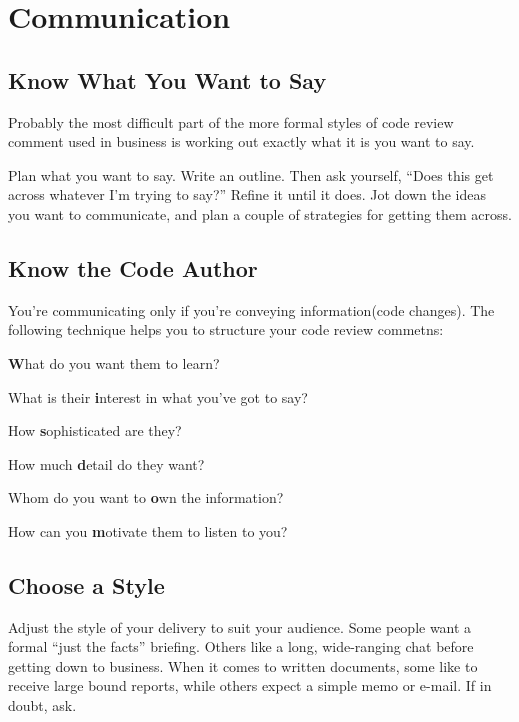 
\chapter{Communication}

\section{Know What You Want to Say}

Probably the most difficult part of the more formal styles of code review comment used in business is working out exactly what it is you want to say.

Plan what you want to say. Write an outline. Then ask yourself, “Does this get across whatever I'm trying to say?” Refine it until it does. Jot down the ideas you want to communicate, and plan a couple of strategies for getting them across.

\section{Know the Code Author}

You're communicating only if you're conveying information(code changes). The following technique helps you to structure your code review commetns:

\begin{tcolorbox}[
    title = The \textbf{WISDOM} acrostic - understanding the audience(code author)
]

\textbf{W}hat do you want them to learn?

What is their \textbf{i}nterest in what you've got to say?

How \textbf{s}ophisticated are they?

How much \textbf{d}etail do they want?

Whom do you want to \textbf{o}wn the information?

How can you \textbf{m}otivate them to listen to you?

\end{tcolorbox}

\section{Choose a Style}

Adjust the style of your delivery to suit your audience. Some people want a formal “just the facts” briefing. Others like a long, wide-ranging chat before getting down to business. When it comes to written documents, some like to receive large bound reports, while others expect a simple memo or e-mail. If in doubt, ask.

